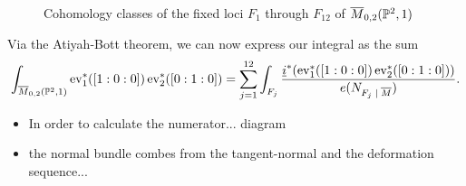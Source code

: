 \documentclass[12pt]{memoir}
\begin{document}
\begin{Ex}
\begin{figure}[h!]
        \caption{Cohomology classes of the fixed loci $F_1$ through $F_{12}$ of $\overline M_{0,2}(\mathbb{P}^2,1)$}
        \label{fig:fixed-loci-M02P21}
    \end{figure}
    Via the Atiyah-Bott theorem, we can now express our integral as the sum 
    $$\int_{\ov{M}_{0,2}(\bP^2,1)}\ev_1^\ast([1:0:0])\ev_2^\ast([0:1:0])=\sum_{j=1}^{12}\int_{F_j}\frac{\un i^\ast(\ev_1^\ast([1:0:0])\ev_2^\ast([0:1:0]))}{e(N_{F_j\mid \ov M})}.$$
    \begin{itemize}
        \item In order to calculate the numerator... diagram
        \item the normal bundle combes from the tangent-normal and the deformation sequence...
    \end{itemize}
\end{Ex}
\ifx\nextra\undefined
\printindex
\else\fi
\nocite{*}


\end{document}
